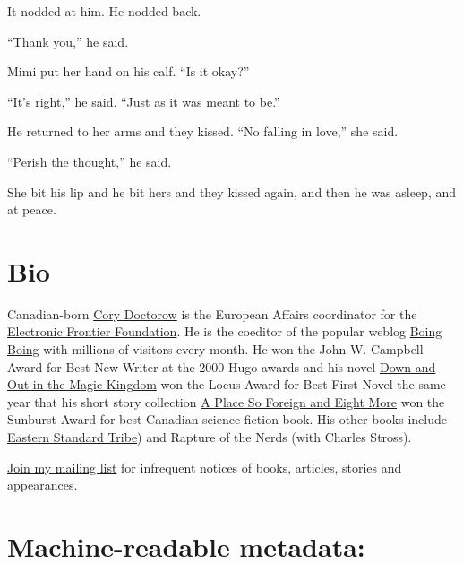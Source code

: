 It nodded at him.  He nodded back.

``Thank you,'' he said.

Mimi put her hand on his calf.  ``Is it okay?''

``It's right,'' he said.  ``Just as it was meant to be.''

He returned to her arms and they kissed.  ``No falling in love,'' she
said.

``Perish the thought,'' he said.

She bit his lip and he bit hers and they kissed again, and then he was
asleep, and at peace.

\section{Bio}

Canadian-born \href{http://www.craphound.com/}{Cory Doctorow} is
the European Affairs coordinator for the 
\break
\href{http://www.eff.org}{Electronic Frontier Foundation}.  He is
the coeditor of the popular weblog 
\href{http://boingboing.net}{Boing Boing} with millions of visitors
every month.  He won the John W.  Campbell Award for Best New Writer
at the 2000 Hugo awards and his novel 
\href{http://craphound.com/down/}{Down and Out in the Magic
Kingdom} won the Locus Award for Best First Novel the same year
that his short story collection 
\href{http://craphound.com/place/}{A Place So Foreign and Eight
More} won the Sunburst Award for best Canadian science fiction
book.  His other books include 
\href{http://craphound.com/est/}{Eastern Standard Tribe}) and
Rapture of the Nerds (with Charles Stross).

\href{http://www.ctyme.com/mailman/listinfo/doctorow}{Join my mailing
list} for infrequent notices of books, articles, stories and
appearances.

\section{Machine-readable metadata:}


